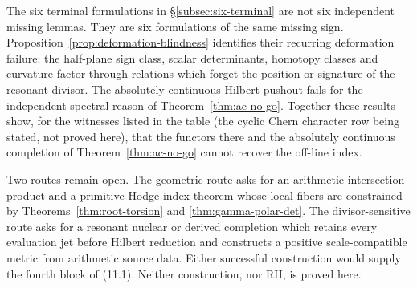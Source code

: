 \documentclass[11pt]{amsart}
\theoremstyle{definition}
\theoremstyle{remark}
\begin{document}
The six terminal formulations in \S\ref{subsec:six-terminal} are not six independent missing
lemmas.  They are six formulations of the same missing sign.
Proposition~\ref{prop:deformation-blindness} identifies their recurring
deformation failure: the half-plane sign class, scalar determinants, homotopy classes and curvature
factor through relations which forget the position or signature of the
resonant divisor.  The absolutely continuous Hilbert pushout fails for the
independent spectral reason of Theorem~\ref{thm:ac-no-go}.  Together these
results show, for the witnesses listed in the table (the cyclic Chern
character row being stated, not proved here), that the functors there and the absolutely
continuous completion of Theorem~\ref{thm:ac-no-go} cannot recover the
off-line index.

Two routes remain open.  The geometric route asks for an arithmetic
intersection product and a primitive Hodge-index theorem whose local
fibers are constrained by Theorems~\ref{thm:root-torsion} and
\ref{thm:gamma-polar-det}.  The divisor-sensitive route asks for a
resonant nuclear or derived completion which retains every evaluation jet
before Hilbert reduction and constructs a positive scale-compatible metric
from arithmetic source data.  Either successful construction would supply
the fourth block of (11.1).  Neither construction, nor RH, is proved here.
\end{document}
